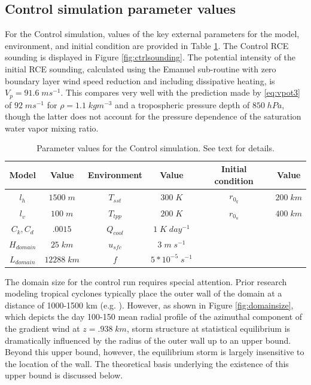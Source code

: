 \documentclass[12pt]{article}
\begin{document}
\subsection{Control simulation parameter values}
For the Control simulation, values of the key external parameters for the model, environment, and initial condition are provided in Table \ref{table:parameters_ctrl}. The Control RCE sounding is displayed in Figure \ref{fig:ctrlsounding}. The potential intensity of the initial RCE sounding, calculated using the Emanuel sub-routine with zero boundary layer wind speed reduction and including dissipative heating, is $V_p = 91.6 \; ms^{-1}$.  This compares very well with the prediction made by \eqref{eq:vpot3} of $92 \; ms^{-1}$ for $\rho =  1.1 \; kgm^{-3}$ and a tropospheric pressure depth of $850 \; hPa$, though the latter does not account for the pressure dependence of the saturation water vapor mixing ratio.

\begin{table}[t]
\caption{Parameter values for the Control simulation. See text for details.}\label{t1}
\label{table:parameters_ctrl}
\begin{center}
\begin{tabular}{cccccc}
\hline\hline
Model & Value & Environment & Value & Initial condition & Value \\
\hline
$l_h$ & $1500 \; m$ & $T_{sst}$ & $300 \; K$ & $r_{0_q}$ & $200 \; km$ \\
$l_v$ & $100 \; m$ & $T_{tpp}$ & $200 \; K$ & $r_{0_u}$ & $400 \; km$ \\
$C_k, C_d$ & $.0015$ & $Q_{cool}$ & $1 \; K \; day^{-1}$ & \\
$H_{domain}$ & $25 \; km$ & $u_{sfc}$ & $3 \; m \; s^{-1}$ & \\
$L_{domain}$ & $12288 \; km$ & $f$ & $5*10^{-5} \; s^{-1}$ & \\
\hline
\end{tabular}
\end{center}
\end{table}

The domain size for the control run requires special attention. Prior research modeling tropical cyclones typically place the outer wall of the domain at a distance of 1000-1500 km (e.g. \cite{Rotunno_Emanuel_1987, Hakim_2011}).  However, as shown in Figure \ref{fig:domainsize}, which depicts the day 100-150 mean radial profile of the azimuthal component of the gradient wind at $z = .938 \; km$, storm structure at statistical equilibrium is dramatically influenced by the radius of the outer wall up to an upper bound. Beyond this upper bound, however, the equilibrium storm is largely insensitive to the location of the wall. The theoretical basis underlying the existence of this upper bound is discussed below.
\end{document}
